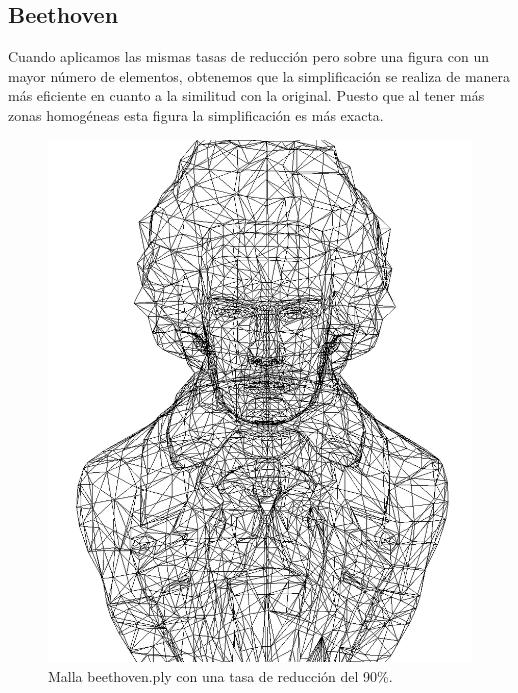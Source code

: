 \subsection{Beethoven}
Cuando aplicamos las mismas tasas de reducción pero sobre una figura con un mayor número de elementos, obtenemos que la simplificación se realiza de manera más eficiente en cuanto a la similitud con la original. Puesto que al tener más zonas homogéneas esta figura la simplificación es más exacta.\\

\begin{figure} %
	\centering
	\includegraphics[scale=0.25]{imagenes/beethoven_90.png} 
	\caption{Malla beethoven.ply con una tasa de reducción del 90\%.} \label{fig:beethoven_90.png}
\end{figure}

